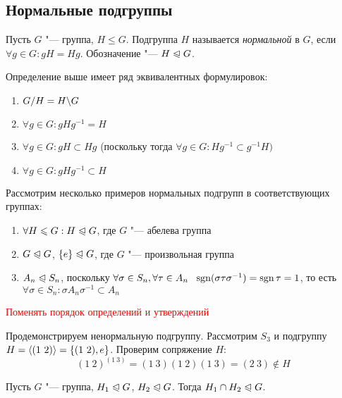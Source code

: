 \subsection{Нормальные подгруппы}

\begin{definition}
	Пусть $G$ "--- группа, $H \le G$. Подгруппа $H$ называется \textit{нормальной} в $G$, если $\forall g \in G: gH = Hg$. Обозначение "--- $H \trianglelefteqslant G$.
\end{definition}

\begin{note}
	Определение выше имеет ряд эквивалентных формулировок:
	\begin{enumerate}
		\item $G / H = H \backslash G$
		\item $\forall g \in G: gHg^{-1} = H$
		\item $\forall g \in G: gH \subset Hg$ (поскольку тогда $\forall g \in G: Hg^{-1} \subset g^{-1}H)$
		\item $\forall g \in G: gHg^{-1} \subset H$
	\end{enumerate}
\end{note}

\begin{example}
	Рассмотрим несколько примеров нормальных подгрупп в соответствующих группах:
	\begin{enumerate}
		\item $\forall H \leqslant G: H \trianglelefteqslant G$, где $G$ "--- абелева группа
		\item $G \trianglelefteqslant G$, $\{e\} \trianglelefteqslant G$, где $G$ "--- произвольная группа
		\item $A_n \trianglelefteqslant S_n$, поскольку $\forall \sigma \in S_n, \forall \tau \in A_n\ \ \sgn(\sigma\tau\sigma^{-1}) = \sgn\tau = 1$, то есть $\forall \sigma \in S_n: \sigma A_n\sigma^{-1} \subset A_n$
	\end{enumerate}
\end{example}


\textcolor{red}{Поменять порядок определений и утверждений}

\begin{example}
	Продемонстрируем ненормальную подгруппу. Рассмотрим $S_3$ и подгруппу $H = \langle(1\ 2)\rangle = \{(1\ 2), e\}$. Проверим сопряжение $H$:
	\[
		(1\ 2)^{(1 \ 3)} = (1\ 3)(1\ 2)(1\ 3) = (2\ 3) \notin H
	\]
\end{example}

\begin{proposition}
	Пусть $G$ "--- группа, $H_1 \trianglelefteqslant G$, $H_2 \trianglelefteqslant G$. Тогда $H_1 \cap H_2 \hm\normal G$.
\end{proposition}

